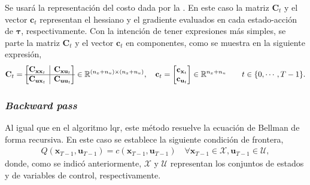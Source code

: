 Se usará la representación del costo dada por la . En este caso la matriz $\mathbf{C}_{t}$ y el vector $\mathbf{c}_t$ representan el hessiano y el gradiente evaluados en cada estado-acción de $\bm{\tau}$, respectivamente. Con la intención de tener expresiones más simples, se parte la matriz $\mathbf{C}_t$ y el vector $\mathbf{c}_t$ en componentes, como se muestra en la siguiente expresión, 
\begin{align}
\mathbf{C}_t =
    \begin{bmatrix}
     \mathbf{C}_{\mathbf{x}\mathbf{x}_t}& \rvline & \mathbf{C}_{\mathbf{x} \mathbf{u}_t} \\ \hline 
    \mathbf{C}_{\mathbf{u}\mathbf{x}_t} & \rvline & 
    \mathbf{C}_{\mathbf{u}\mathbf{u}_t} 
    \end{bmatrix} 
    \in \mathbb{R}^{(n_{x}+n_{u})\times(n_{x} + n_{u})}
    ,
    \quad 
    \mathbf{c}_t = 
    \begin{bmatrix}
        \mathbf{c}_{\mathbf{x}_t} \\
        \mathbf{c}_{\mathbf{u}_t}
    \end{bmatrix} 
    \in \mathbb{R}^{n_x + n_u}
    \qquad t\in \{0, \cdots, T-1\}.
\end{align} 
\subsubsection{\textit{Backward pass}}
Al igual que en el algoritmo \acrshort{lqr}, este método resuelve la ecuación de Bellman de forma recursiva. En este caso se establece la siguiente condición de frontera,
\begin{align}\label{eq:Q_front}
    Q(\mathbf{x}_{T-1}, \mathbf{u}_{T-1}) = c(\mathbf{x}_{T-1}, \mathbf{u}_{T-1}) \quad \forall\mathbf{x}_{T-1} \in\mathcal{X}, \mathbf{u}_{T-1} \in \mathcal{U},
\end{align}
donde, como se indicó anteriormente, $\mathcal{X}$ y $\mathcal{U}$ representan los conjuntos de estados y de variables de control, respectivamente.


